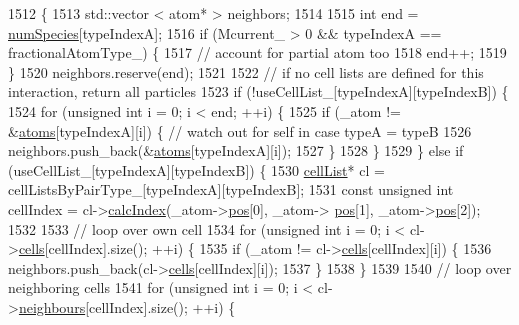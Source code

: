 \begin{DoxyCode}
1512                                                                                                            
                    \{
1513     std::vector < atom* > neighbors;
1514 
1515     \textcolor{keywordtype}{int} end = \hyperlink{classsim_system_a9eea865e6dc1cff377b1e79c4d9c23f0}{numSpecies}[typeIndexA];
1516     \textcolor{keywordflow}{if} (Mcurrent\_ > 0 && typeIndexA == fractionalAtomType\_) \{
1517         \textcolor{comment}{// account for partial atom too}
1518         end++;
1519     \}
1520     neighbors.reserve(end);
1521 
1522     \textcolor{comment}{// if no cell lists are defined for this interaction, return all particles}
1523     \textcolor{keywordflow}{if} (!useCellList\_[typeIndexA][typeIndexB]) \{
1524         \textcolor{keywordflow}{for} (\textcolor{keywordtype}{unsigned} \textcolor{keywordtype}{int} i = 0; i < end; ++i) \{
1525             \textcolor{keywordflow}{if} (\_atom != &\hyperlink{classsim_system_a90421b19082f7fb8fc23b7264b1161e4}{atoms}[typeIndexA][i]) \{ \textcolor{comment}{// watch out for self in case typeA = typeB}
1526                 neighbors.push\_back(&\hyperlink{classsim_system_a90421b19082f7fb8fc23b7264b1161e4}{atoms}[typeIndexA][i]);
1527             \}
1528         \}
1529     \} \textcolor{keywordflow}{else} \textcolor{keywordflow}{if} (useCellList\_[typeIndexA][typeIndexB]) \{
1530         \hyperlink{classcell_list}{cellList}* cl = cellListsByPairType\_[typeIndexA][typeIndexB];
1531         \textcolor{keyword}{const} \textcolor{keywordtype}{unsigned} \textcolor{keywordtype}{int} cellIndex = cl->\hyperlink{classcell_list_aa6b843131cd487164a137571c7343cab}{calcIndex}(\_atom->\hyperlink{classatom_a3ae5f4880e7831d8b2c9fda72b4eb24a}{pos}[0], \_atom->
      \hyperlink{classatom_a3ae5f4880e7831d8b2c9fda72b4eb24a}{pos}[1], \_atom->\hyperlink{classatom_a3ae5f4880e7831d8b2c9fda72b4eb24a}{pos}[2]);
1532 
1533         \textcolor{comment}{// loop over own cell}
1534         \textcolor{keywordflow}{for} (\textcolor{keywordtype}{unsigned} \textcolor{keywordtype}{int} i = 0; i < cl->\hyperlink{classcell_list_a10bc0c3ae819293b1e88bc7d1bfdb2aa}{cells}[cellIndex].size(); ++i) \{
1535             \textcolor{keywordflow}{if} (\_atom != cl->\hyperlink{classcell_list_a10bc0c3ae819293b1e88bc7d1bfdb2aa}{cells}[cellIndex][i]) \{
1536                 neighbors.push\_back(cl->\hyperlink{classcell_list_a10bc0c3ae819293b1e88bc7d1bfdb2aa}{cells}[cellIndex][i]);
1537             \}
1538         \}
1539 
1540         \textcolor{comment}{// loop over neighboring cells}
1541         \textcolor{keywordflow}{for} (\textcolor{keywordtype}{unsigned} \textcolor{keywordtype}{int} i = 0; i < cl->\hyperlink{classcell_list_ada607886d0e5a20d710dde694d6d989f}{neighbours}[cellIndex].size(); ++i) \{

\end{DoxyCode}
